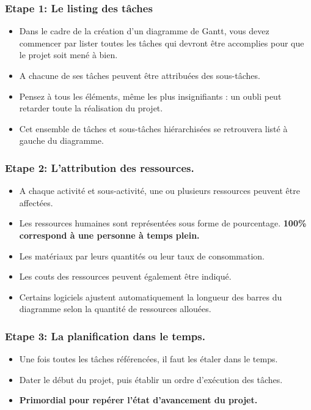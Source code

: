 \documentclass{beamer}
\begin{document}
\begin{frame}
  \frametitle{Etape 1: Le listing des tâches}
  \begin{itemize}
  \item Dans le cadre de la création d'un diagramme de Gantt, vous devez commencer par \alert{lister toutes les tâches qui devront être accomplies} pour que le projet soit mené à bien.
  \item A chacune de ses tâches peuvent être attribuées des sous-tâches.
  \item \alert{Pensez à tous les éléments}, même les plus insignifiants : un oubli peut retarder toute la réalisation du projet.
  \item Cet ensemble de tâches et sous-tâches hiérarchisées se retrouvera listé à gauche du diagramme.
  \end{itemize}
\end{frame}

\begin{frame}
  \frametitle{Etape 2: L'attribution des ressources.}
  \begin{itemize}
  \item A chaque activité et sous-activité, une ou plusieurs ressources peuvent être affectées.
  \item Les ressources humaines sont représentées sous forme de pourcentage. \textbf{100\% correspond à une personne à temps plein.}
  \item Les matériaux par \alert{leurs quantités ou leur taux de consommation.}
  \item Les couts des ressources peuvent également être indiqué.
  \item Certains logiciels \alert{ajustent automatiquement la longueur} des barres du diagramme selon la quantité de ressources allouées.
  \end{itemize}
\end{frame}


\begin{frame}
  \frametitle{Etape 3: La planification dans le temps.}
  \begin{itemize}
  \item Une fois toutes les tâches référencées, il faut les étaler dans le temps.
  \item \alert{Dater le début du projet}, puis établir un ordre d'exécution des tâches.
  \item \textbf{Primordial pour repérer l'état d'avancement du projet.}
  \end{itemize}
\end{frame}
\end{document}
